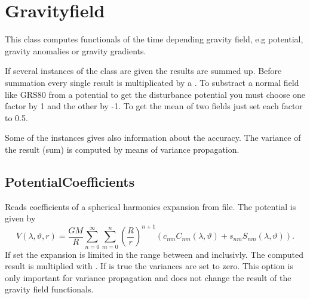 \clearpage

\section{Gravityfield}\label{gravityfieldType}
This class computes functionals of the time depending gravity field,
e.g potential, gravity anomalies or gravity gradients.

If several instances of the class are given the results are summed up.
Before summation every single result is multiplicated by a .
To substract a normal field like GRS80 from a potential
to get the disturbance potential you must choose one factor by 1
and the other by -1. To get the mean of two fields just set each factor to 0.5.

Some of the instances gives also information about the accuracy.
The variance of the result (sum) is computed by means of variance propagation.


\subsection{PotentialCoefficients}\label{gravityfieldType:potentialCoefficients}
Reads coefficients of a spherical harmonics expansion from file.
The potential is given by
\begin{equation}
V(\lambda,\vartheta,r) = \frac{GM}{R}\sum_{n=0}^\infty \sum_{m=0}^n \left(\frac{R}{r}\right)^{n+1}
  \left(c_{nm} C_{nm}(\lambda,\vartheta) + s_{nm} S_{nm}(\lambda,\vartheta)\right).
\end{equation}
If set the expansion is limited in the range between 
and  inclusivly. The computed result
is multiplied with . If  is true
the variances are set to zero. This option is only important for variance propagation
and does not change the result of the gravity field functionals.



